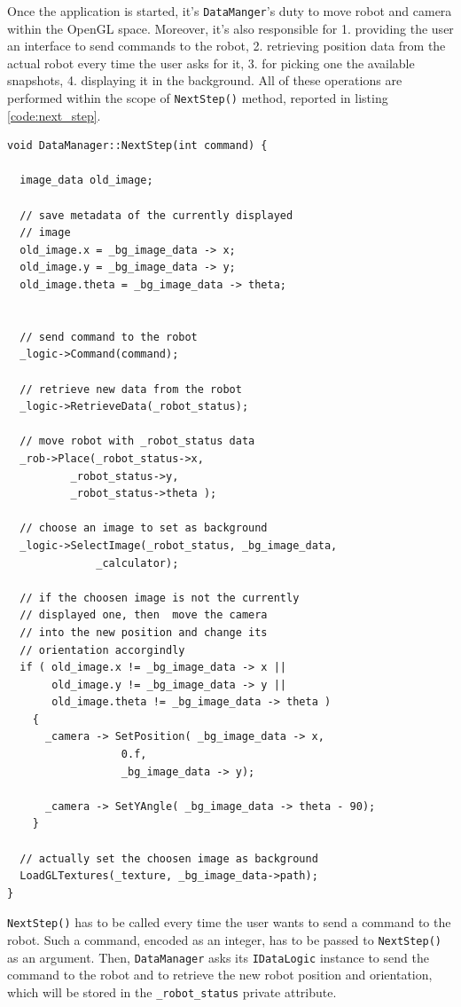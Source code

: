 %
Once the application is started, it's \texttt{DataManger}'s duty 
to move robot and camera within the OpenGL space. Moreover, 
it's also responsible for 1. providing the user an interface 
to send commands to the robot, 2. retrieving position 
data from the actual robot every time the user asks 
for it, 3. for picking one the available snapshots, 
4. displaying it in the background. 
%
All of these operations are performed within the 
scope of \texttt{NextStep()} method, reported in 
listing \ref{code:next_step}.
%
\begin{lstlisting}[caption={The \texttt{DataManager::NextStep()} method}, label={code:next_step}, frame=trBL]
void DataManager::NextStep(int command) {

  image_data old_image;

  // save metadata of the currently displayed 
  // image
  old_image.x = _bg_image_data -> x;
  old_image.y = _bg_image_data -> y;
  old_image.theta = _bg_image_data -> theta;


  // send command to the robot
  _logic->Command(command);

  // retrieve new data from the robot
  _logic->RetrieveData(_robot_status);

  // move robot with _robot_status data
  _rob->Place(_robot_status->x,
	      _robot_status->y,
	      _robot_status->theta ); 

  // choose an image to set as background
  _logic->SelectImage(_robot_status, _bg_image_data,
		      _calculator);

  // if the choosen image is not the currently
  // displayed one, then  move the camera
  // into the new position and change its 
  // orientation accorgindly
  if ( old_image.x != _bg_image_data -> x ||
       old_image.y != _bg_image_data -> y ||
       old_image.theta != _bg_image_data -> theta )
    {
      _camera -> SetPosition( _bg_image_data -> x,
			      0.f,
			      _bg_image_data -> y);
      
      _camera -> SetYAngle( _bg_image_data -> theta - 90);
    }

  // actually set the choosen image as background
  LoadGLTextures(_texture, _bg_image_data->path);
}
\end{lstlisting}
%
\texttt{NextStep()} has to be called every time 
the user wants to send a command to the robot. 
%
Such a command, encoded as an integer, has to be passed to 
\texttt{NextStep()} as an argument.
%
Then, \texttt{DataManager} asks its \texttt{IDataLogic} 
instance to send the command to the robot and to 
retrieve the new robot position and orientation, which will be 
stored in the \texttt{\_robot\_status} private attribute.
%

